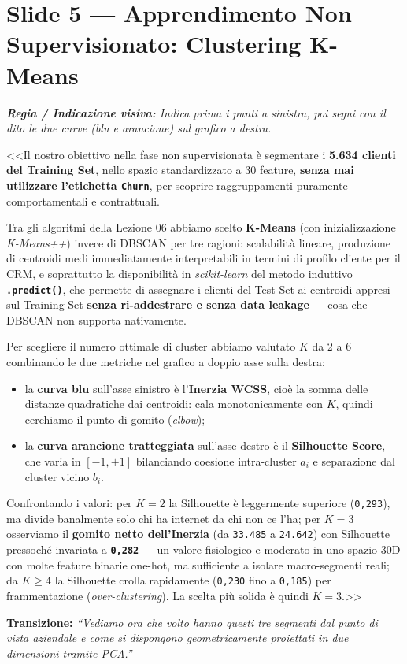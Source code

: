 \documentclass[10pt, a4paper]{article}
\newcommand{\cue}[1]{%
  \par\vspace{2pt}\noindent\colorbox{CueBg}{\parbox{\dimexpr\linewidth-2\fboxsep}{\footnotesize\textit{\color{PrimaryNavy}\textbf{Regia / Indicazione visiva:} #1}}}\par\vspace{3pt}%
}
\newcommand{\transition}[1]{%
  \par\vspace{2pt}\noindent\colorbox{LightBg}{\parbox{\dimexpr\linewidth-2\fboxsep}{\small\textbf{\color{SecondaryBlue}Transizione:} \textit{``#1''}}}\par\vspace{4pt}%
}
\begin{document}
\section*{Slide 5 --- Apprendimento Non Supervisionato: Clustering K-Means}
\cue{Indica prima i punti a sinistra, poi segui con il dito le due curve (blu e arancione) sul grafico a destra.}
\noindent <<Il nostro obiettivo nella fase non supervisionata è segmentare i \textbf{5.634 clienti del Training Set}, nello spazio standardizzato a 30 feature, \textbf{senza mai utilizzare l'etichetta \texttt{Churn}}, per scoprire raggruppamenti puramente comportamentali e contrattuali.

Tra gli algoritmi della Lezione 06 abbiamo scelto \textbf{K-Means} (con inizializzazione \textit{K-Means++}) invece di DBSCAN per tre ragioni: scalabilità lineare, produzione di centroidi medi immediatamente interpretabili in termini di profilo cliente per il CRM, e soprattutto la disponibilità in \textit{scikit-learn} del metodo induttivo \textbf{\texttt{.predict()}}, che permette di assegnare i clienti del Test Set ai centroidi appresi sul Training Set \textbf{senza ri-addestrare e senza data leakage} --- cosa che DBSCAN non supporta nativamente.

Per scegliere il numero ottimale di cluster abbiamo valutato $K$ da 2 a 6 combinando le due metriche nel grafico a doppio asse sulla destra:
\begin{itemize}
    \item la \textbf{curva blu} sull'asse sinistro è l'\textbf{Inerzia WCSS}, cioè la somma delle distanze quadratiche dai centroidi: cala monotonicamente con $K$, quindi cerchiamo il punto di gomito (\textit{elbow});
    \item la \textbf{curva arancione tratteggiata} sull'asse destro è il \textbf{Silhouette Score}, che varia in $[-1, +1]$ bilanciando coesione intra-cluster $a_i$ e separazione dal cluster vicino $b_i$.
\end{itemize}
Confrontando i valori: per \textbf{$K=2$} la Silhouette è leggermente superiore (\texttt{0,293}), ma divide banalmente solo chi ha internet da chi non ce l'ha; per \textbf{$K=3$} osserviamo il \textbf{gomito netto dell'Inerzia} (da \texttt{33.485} a \texttt{24.642}) con Silhouette pressoché invariata a \textbf{\texttt{0,282}} --- un valore fisiologico e moderato in uno spazio 30D con molte feature binarie one-hot, ma sufficiente a isolare macro-segmenti reali; da \textbf{$K \ge 4$} la Silhouette crolla rapidamente (\texttt{0,230} fino a \texttt{0,185}) per frammentazione (\textit{over-clustering}). La scelta più solida è quindi \textbf{$K = 3$}.>>
\transition{Vediamo ora che volto hanno questi tre segmenti dal punto di vista aziendale e come si dispongono geometricamente proiettati in due dimensioni tramite PCA.}
\end{document}
